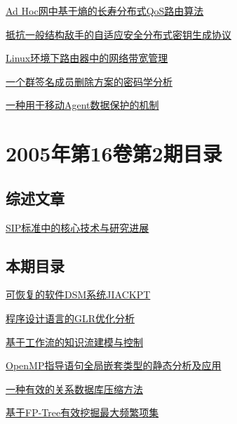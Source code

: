 \documentclass[a4paper]{article}
\begin{document}
\href{http://www.jos.org.cn/ch/reader/download_pdf.aspx?file_no=20050314&year_id=2005&quarter_id=3&falg=1}{Ad Hoc网中基于熵的长寿分布式QoS路由算法}

\href{http://www.jos.org.cn/ch/reader/download_pdf.aspx?file_no=20050315&year_id=2005&quarter_id=3&falg=1}{抵抗一般结构敌手的自适应安全分布式密钥生成协议}

\href{http://www.jos.org.cn/ch/reader/download_pdf.aspx?file_no=20050316&year_id=2005&quarter_id=3&falg=1}{Linux环境下路由器中的网络带宽管理}

\href{http://www.jos.org.cn/ch/reader/download_pdf.aspx?file_no=20050317&year_id=2005&quarter_id=3&falg=1}{一个群签名成员删除方案的密码学分析}

\href{http://www.jos.org.cn/ch/reader/download_pdf.aspx?file_no=20050318&year_id=2005&quarter_id=3&falg=1}{一种用于移动Agent数据保护的机制}


\section{\textbf{2005年第16卷第2期目录}}
\subsection{综述文章}
\href{http://www.jos.org.cn/ch/reader/download_pdf.aspx?file_no=20050209&year_id=2005&quarter_id=2&falg=1}{SIP标准中的核心技术与研究进展}

\subsection{本期目录}
\href{http://www.jos.org.cn/ch/reader/download_pdf.aspx?file_no=20050201&year_id=2005&quarter_id=2&falg=1}{可恢复的软件DSM系统JIACKPT}

\href{http://www.jos.org.cn/ch/reader/download_pdf.aspx?file_no=20050202&year_id=2005&quarter_id=2&falg=1}{程序设计语言的GLR优化分析}

\href{http://www.jos.org.cn/ch/reader/download_pdf.aspx?file_no=20050203&year_id=2005&quarter_id=2&falg=1}{基于工作流的知识流建模与控制}

\href{http://www.jos.org.cn/ch/reader/download_pdf.aspx?file_no=20050204&year_id=2005&quarter_id=2&falg=1}{OpenMP指导语句全局嵌套类型的静态分析及应用}

\href{http://www.jos.org.cn/ch/reader/download_pdf.aspx?file_no=20050205&year_id=2005&quarter_id=2&falg=1}{一种有效的关系数据库压缩方法}

\href{http://www.jos.org.cn/ch/reader/download_pdf.aspx?file_no=20050206&year_id=2005&quarter_id=2&falg=1}{基于FP-Tree有效挖掘最大频繁项集}
\end{document}
